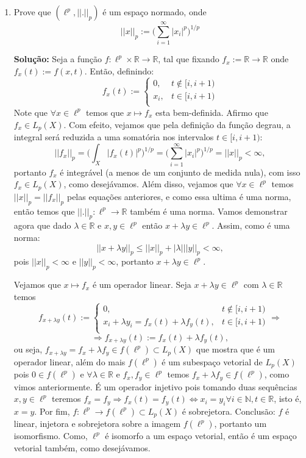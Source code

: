 \documentclass{article}
\begin{document}
\begin{enumerate}
\begin{enumerate}
				\item Prove que $(\ell^{p}, ||.||_p)$ é um espaço normado, onde
				$$
				||x||_{p} := \Big(\sum \limits_{i=1}^{\infty} |x_{i}|^{p}\Big)^{1/p}
				$$
				
				\textbf{Solução:} Seja a função $f: \ell^{p} \times \mathbb{R} \to \mathbb{R}$, tal que fixando $f_{x} := \mathbb{R} \to \mathbb{R}$ onde $f_{x}(t) := f(x, t)$. Então, definindo:
				$$
				f_{x}(t) := \left\{
				\begin{array}{cc}
				0, & t \notin [i, i+1)\\
				x_{i}, & t \in [i, i+1) \\
				\end{array}
				\right.
				$$
				Note que $\forall x \in \ell^{p}$ temos que $x \mapsto f_{x}$ esta bem-definida. Afirmo que $f_{x} \in L_{p}(X)$. Com efeito, vejamos que pela definição da função degrau, a integral será reduzida a uma somatória nos intervalos $t \in [i, i+1)$: 
				$$
				||f_{x}||_{p} = \Big(\int_{X}|f_x(t)|^{p}\Big)^{1/p} = \Big(\sum \limits_{i=1}^{\infty}|x_i|^{p}\Big)^{1/p} = ||x||_{p} < \infty, 
				$$
				portanto $f_{x}$ é integrável (a menos de um conjunto de medida nula), com isso $f_{x} \in L_{p}(X)$, como desejávamos. Além disso, vejamos que $\forall x \in \ell^{p}$ temos $||x||_{p} = ||f_{x}||_{p}$ pelas equações anteriores, e como essa ultima é uma norma, então temos que $||.||_{p}: \ell^{p} \to \mathbb{R}$ também é uma norma. Vamos demonstrar agora que dado $\lambda \in \mathbb{R}$ e $x, y \in \ell^{p}$ então $x+\lambda y \in \ell^{p}$. Assim, como é uma norma:
				$$
				||x+\lambda y||_{p} \leq ||x||_{p} + |\lambda |||y||_{p} < \infty,
				$$
				pois $||x||_{p} < \infty$ e $||y||_{p} < \infty$, portanto $x+\lambda y \in \ell^{p}$.
				
				Vejamos que $x \mapsto f_{x}$ é um operador linear. Seja $x + \lambda y \in \ell^{p}$ com $\lambda \in \mathbb{R}$ temos
				$$
				f_{x + \lambda y }(t) := \left\{
				\begin{array}{cc}
				0, & t \notin [i, i+1)\\
				x_{i} +\lambda y_{i} = f_{x}(t) + \lambda f_{y}(t), & t \in [i, i+1) \\
				\end{array}
				\right. \Rightarrow				
				$$
				$$
				\Rightarrow f_{x + \lambda y }(t) := f_{x}(t) + \lambda f_{y}(t),
				$$
				ou seja, $f_{x + \lambda y } = f_{x} + \lambda f_{y } \in f(\ell^{p}) \subset L_{p}(X)$ que mostra que é um operador linear, além do mais $f(\ell^{p})$ é um subespaço vetorial de $L_{p}(X)$ pois $0 \in f(\ell^{p})$ e $\forall \lambda \in \mathbb{R}$ e $f_{x}, f_{y} \in \ell^{p}$ temos $f_{x} + \lambda f_{y } \in f(\ell^{p})$, como vimos anteriormente. É um operador injetivo pois tomando duas sequências $x, y \in \ell^{p}$ teremos $f_{x} = f_{y} \Rightarrow f_{x}(t) = f_{y}(t) \iff x_{i} = y_{i} \forall i \in \mathbb{N}, t \in \mathbb{R}$, isto é, $x=y$. Por fim, $f: \ell^{p} \to f(\ell^{p}) \subset L_{p}(X)$ é sobrejetora. Conclusão: $f$ é linear, injetora e sobrejetora sobre a imagem $f(\ell^{p})$, portanto um isomorfismo. Como, $\ell^{p}$ é isomorfo a um espaço vetorial, então é um espaço vetorial também, como desejávamos.
				

\end{enumerate}
\end{enumerate}
\end{document}
